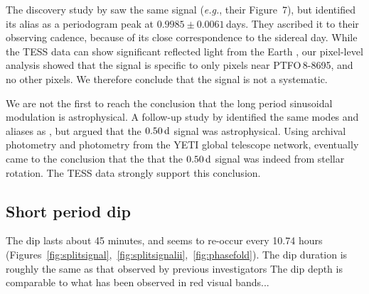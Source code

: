\documentclass[12pt,twocolumn,tighten]{aastex62}
\newcommand{\ptfo}{PTFO$\,$8-8695}
\begin{document}
The discovery study by \citet{van_eyken_ptf_2012} saw the same signal
({\it e.g.}, their Figure~7), but identified its alias as a
periodogram peak at $0.9985 \pm 0.0061\,$days. They ascribed it to
their observing cadence, because of its close correspondence to the
sidereal day.  While the TESS data can show significant reflected
light from the Earth \citep[{\it e.g.},][]{luger_tess_2019}, our
pixel-level analysis showed that the signal is specific to only pixels
near \ptfo, and no other pixels.  We therefore conclude that the
signal is not a systematic.

We are not the first to reach the conclusion that the long period
sinusoidal modulation is astrophysical.  A follow-up study by
\citet{koen_multicolour_2015} identified the same modes and aliases as
\citet{van_eyken_ptf_2012}, but argued that the $0.50\,{\rm d}$ signal
was astrophysical.  Using archival photometry and photometry from the
YETI global telescope network, \citet{raetz_yeti_2016} eventually came
to the conclusion that the that the $0.50\,{\rm d}$ signal was indeed
from stellar rotation.  The TESS data strongly support this
conclusion.



\subsection{Short period dip}
The dip lasts about 45 minutes, and seems to re-occur every 10.74
hours
(Figures~\ref{fig:splitsignal},~\ref{fig:splitsignalii},~\ref{fig:phasefold}).
The dip duration is roughly the same as that observed by previous
investigators \citep{van_eyken_ptf_2012,yu_tests_2015}
The dip depth is comparable to what has been observed in red visual
bands...
\end{document}

